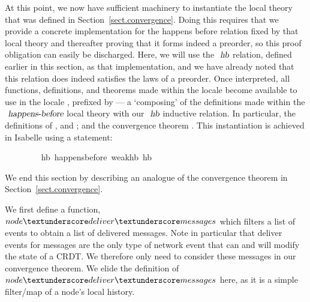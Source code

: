 \documentclass[acmlarge,review,anonymous]{acmart}\settopmatter{printfolios=true}
\begin{document}
At this point, we now have sufficient machinery to instantiate the  local theory that was defined in Section~\ref{sect.convergence}.
Doing this requires that we provide a concrete implementation for the happens before relation fixed by that local theory and thereafter proving that it forms indeed a preorder, so this proof obligation can easily be discharged.
Here, we will use the $\isa{hb}$ relation, defined earlier in this section, as that implementation, and we have already noted that this relation does indeed satisfies the laws of a preorder.
Once interpreted, all functions, definitions, and theorems made within the  locale become available to use in the locale , prefixed by --- a `composing' of the definitions made within the $\isa{happens-before}$ local theory with our $\isa{hb}$ inductive relation.
In particular, the definitions of ,  and ; and the convergence theorem .
This instantiation is achieved in Isabelle using a  statement:
\\
\begin{isabellebody}
\ \ \ \ \ \ \ \  hb{\isacharcolon}\ happens{\isacharunderscore}before\ weak{\isacharunderscore}hb\ hb
\end{isabellebody}
\vspace{\baselineskip}
\noindent
We end this section by describing an analogue of the convergence theorem in Section~\ref{sect.convergence}.

We first define a function, $node{\isacharunderscore}deliver{\isacharunderscore}messages$ which filters a list of events to obtain a list of delivered messages.
Note in particular that deliver events for messages are the only type of network event that can and will modify the state of a CRDT.
We therefore only need to consider these messages in our convergence theorem.
We elide the definition of $node{\isacharunderscore}deliver{\isacharunderscore}messages$ here, as it is a simple filter/map of a node's local history.
\end{document}
